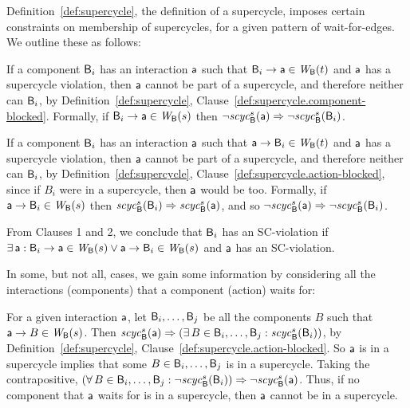 Definition~\ref{def:supercycle}, the definition of a supercycle, imposes certain constraints on membership of
supercycles, for a given pattern of wait-for-edges. We outline these as follows:
\bn

\item If a component $\mathsf{B}_i$ has an interaction $\mathsf{a}$ such that $\mathsf{B}_i \rightarrow \mathsf{a} \in \mathit{W}_{\mathsf{B}}({t})$ and
  $\mathsf{a}$ has a supercycle violation, then $\mathsf{a}$ cannot be part of a supercycle, and therefore
  neither can $\mathsf{B}_i$, by Definition~\ref{def:supercycle},
  Clause~\ref{def:supercycle.component-blocked}.  Formally, if $\mathsf{B}_i \rightarrow \mathsf{a} \in \mathit{W}_{\mathsf{B}}({s})$ then
  $\neg \mathit{scyc}_{\mathsf{B}}^{s}({\mathsf{a}}) \Rightarrow \neg \mathit{scyc}_{\mathsf{B}}^{s}({\mathsf{B}_i})$.

\item If a component $\mathsf{B}_i$ has an interaction $\mathsf{a}$ such that $\mathsf{a} \rightarrow \mathsf{B}_i \in \mathit{W}_{\mathsf{B}}({t})$ and
  $\mathsf{a}$ has a supercycle violation, then $\mathsf{a}$ cannot be part of a supercycle, and therefore
  neither can $\mathsf{B}_i$, by Definition~\ref{def:supercycle},
  Clause~\ref{def:supercycle.action-blocked}, since if $B_i$ were in a supercycle, then $\mathsf{a}$ would
  be too.
Formally, if $\mathsf{a} \rightarrow \mathsf{B}_i \in \mathit{W}_{\mathsf{B}}({s})$ then $\mathit{scyc}_{\mathsf{B}}^{s}({\mathsf{B}_i}) \Rightarrow \mathit{scyc}_{\mathsf{B}}^{s}({\mathsf{a}})$, and so $\neg \mathit{scyc}_{\mathsf{B}}^{s}({\mathsf{a}}) \Rightarrow \neg \mathit{scyc}_{\mathsf{B}}^{s}({\mathsf{B}_i})$.

\en

From Clauses 1 and 2, we conclude that $\mathsf{B}_i$ has an SC-violation if 
$\exists\, \mathsf{a}: \mathsf{B}_i \rightarrow \mathsf{a} \in \mathit{W}_{\mathsf{B}}({s}) \lor \mathsf{a} \rightarrow \mathsf{B}_i \in \mathit{W}_{\mathsf{B}}({s})$ and $\mathsf{a}$ has an SC-violation.

In some, but not all, cases, we gain some information by considering all the interactions (components) that a component
(action) waits for:

\bn

\item For a given interaction $\mathsf{a}$, let $\mathsf{B}_i,\ldots,\mathsf{B}_j$ be all the components $B$ such that $\mathsf{a} \rightarrow
  B \in \mathit{W}_{\mathsf{B}}({s})$.  Then 
 $\mathit{scyc}_{\mathsf{B}}^{s}({\mathsf{a}}) \Rightarrow (\exists\, B \in \mathsf{B}_i,\ldots,\mathsf{B}_j: \mathit{scyc}_{\mathsf{B}}^{s}({\mathsf{B}_i}))$, by 
  Definition~\ref{def:supercycle}, Clause~\ref{def:supercycle.action-blocked}.
  So $\mathsf{a}$ is in a supercycle implies that some $B \in \mathsf{B}_i,\ldots,\mathsf{B}_j$ is
  in a supercycle.  Taking the contrapositive, $(\forall\, B \in \mathsf{B}_i,\ldots,\mathsf{B}_j: \neg \mathit{scyc}_{\mathsf{B}}^{s}({\mathsf{B}_i}))
  \Rightarrow \neg \mathit{scyc}_{\mathsf{B}}^{s}({\mathsf{a}})$.  Thus, if no component that $\mathsf{a}$ waits for is in a supercycle,
  then $\mathsf{a}$ cannot be in a supercycle.

